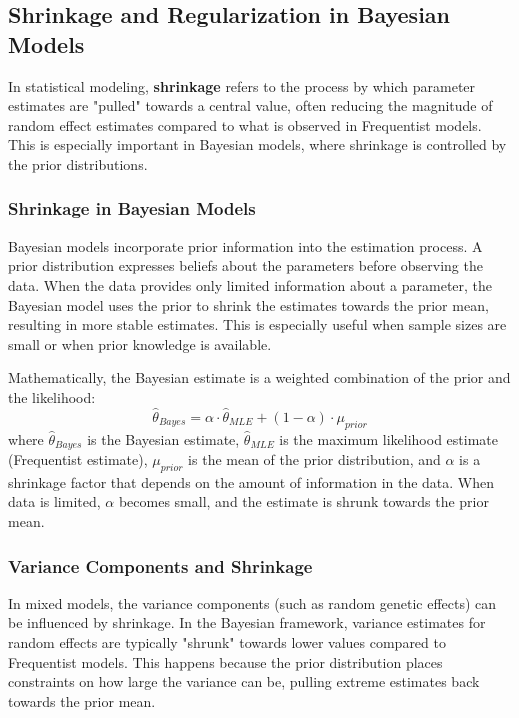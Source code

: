 \documentclass[12pt,a4paper]{article}
\begin{document}
\subsection{Shrinkage and Regularization in Bayesian Models}

In statistical modeling, \textbf{shrinkage} refers to the process by which parameter estimates are "pulled" towards a central value, often reducing the magnitude of random effect estimates compared to what is observed in Frequentist models. This is especially important in Bayesian models, where shrinkage is controlled by the prior distributions.

\subsubsection{Shrinkage in Bayesian Models}

Bayesian models incorporate prior information into the estimation process. A prior distribution expresses beliefs about the parameters before observing the data. When the data provides only limited information about a parameter, the Bayesian model uses the prior to shrink the estimates towards the prior mean, resulting in more stable estimates. This is especially useful when sample sizes are small or when prior knowledge is available.

Mathematically, the Bayesian estimate is a weighted combination of the prior and the likelihood:
\[
\hat{\theta}_{Bayes} = \alpha \cdot \hat{\theta}_{MLE} + (1 - \alpha) \cdot \mu_{prior}
\]
where \( \hat{\theta}_{Bayes} \) is the Bayesian estimate, \( \hat{\theta}_{MLE} \) is the maximum likelihood estimate (Frequentist estimate), \( \mu_{prior} \) is the mean of the prior distribution, and \( \alpha \) is a shrinkage factor that depends on the amount of information in the data. When data is limited, \( \alpha \) becomes small, and the estimate is shrunk towards the prior mean.

\subsubsection{Variance Components and Shrinkage}

In mixed models, the variance components (such as random genetic effects) can be influenced by shrinkage. In the Bayesian framework, variance estimates for random effects are typically "shrunk" towards lower values compared to Frequentist models. This happens because the prior distribution places constraints on how large the variance can be, pulling extreme estimates back towards the prior mean.
\end{document}
